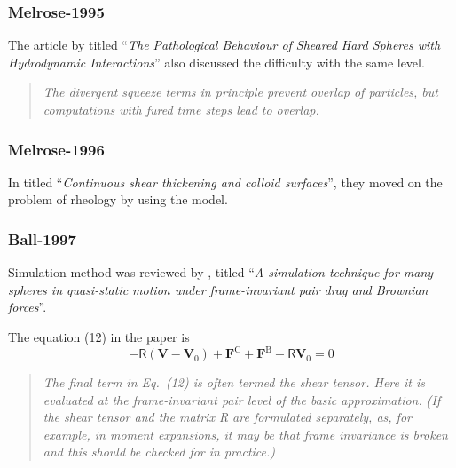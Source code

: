 \documentclass[12pt]{article}
\newcommand{\tens}[1]{\bm{\mathsf{#1}}}
\begin{document}


%

\subsubsection*{Melrose-1995}

The article by \citet{Melrose_1995}
titled ``\emph{The Pathological Behaviour of Sheared Hard Spheres with Hydrodynamic Interactions}'' also discussed the difficulty with the same level.

\begin{quote}
\emph{The divergent squeeze terms in principle prevent overlap of particles,
 but computations with fured time steps lead to overlap. }
\end{quote}

\subsubsection*{Melrose-1996}

In \citet{Melrose_1996}
titled ``\emph{Continuous shear thickening and colloid surfaces}'',
they moved on the problem of rheology 
by using the model.  



\subsubsection*{Ball-1997}

Simulation method was reviewed  
by \citet{Ball_1997},
titled 
``\emph{A simulation technique for many spheres 
in quasi-static motion under frame-invariant pair drag and Brownian forces}''.

The equation (12) in the paper is 
\begin{equation}
 - \tens{R} (\bm{V}-\bm{V}_0)
 + \bm{F}^{\mathrm{C}}
 + \bm{F}^{\mathrm{B}}
 - \tens{R} \bm{V}_0 = 0
\end{equation}

\begin{quotation}
\emph{
 The final term in Eq.~(12) is often termed the shear tensor. 
Here it is evaluated at the frame-invariant pair level of the basic approximation. 
(If the shear tensor and the matrix R are formulated separately,
 as, for example, in moment expansions, 
it may be that frame invariance is broken and this should be checked for in practice.)
}
\end{quotation}
\end{document}
